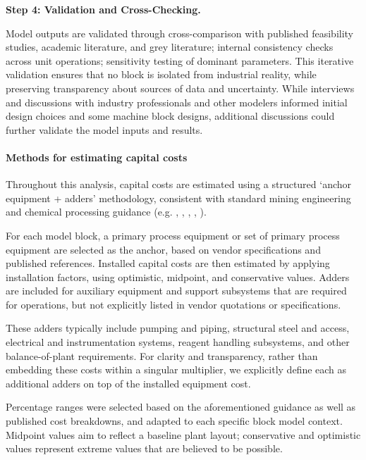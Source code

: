 \documentclass{article}
\renewcommand\_{\textunderscore\allowbreak}
\begin{document}
\medskip
\noindent\textbf{Step 4: Validation and Cross-Checking.}\quad

Model outputs are validated through cross-comparison with published feasibility studies, academic literature, and grey literature; internal consistency checks across unit operations; sensitivity testing of dominant parameters. This iterative validation ensures that no block is isolated from industrial reality, while preserving transparency about sources of data and uncertainty. While interviews and discussions with industry professionals and other modelers informed initial design choices and some machine block designs, additional discussions could further validate the model inputs and results.

\paragraph{Methods for estimating capital costs}\leavevmode\par

Throughout this analysis, capital costs are estimated using a structured `anchor equipment + adders' methodology, consistent with standard mining engineering and chemical processing guidance (e.g. \citet{petersPlantDesignEconomics1991}, \citet{ausimmMonograph27Cost}, \citet{turtonAnalysisSynthesisDesign2009}, \citet{ulrichGuideChemicalEngineering1984}, \citet{darlingSMEMiningEngineering2011}). 

For each model block, a primary process equipment or set of primary process equipment are selected as the anchor, based on vendor specifications and published references. Installed capital costs are then estimated by applying installation factors, using optimistic, midpoint, and conservative values. Adders are included for auxiliary equipment and support subsystems that are required for operations, but not explicitly listed in vendor quotations or specifications. 

These adders typically include pumping and piping, structural steel and access, electrical and instrumentation systems, reagent handling subsystems, and other balance-of-plant requirements. For clarity and transparency, rather than embedding these costs within a singular multiplier, we explicitly define each as additional adders on top of the installed equipment cost. 

Percentage ranges were selected based on the aforementioned guidance as well as published cost breakdowns, and adapted to each specific block model context. Midpoint values aim to reflect a baseline plant layout; conservative and optimistic values represent extreme values that are believed to be possible.
\end{document}
